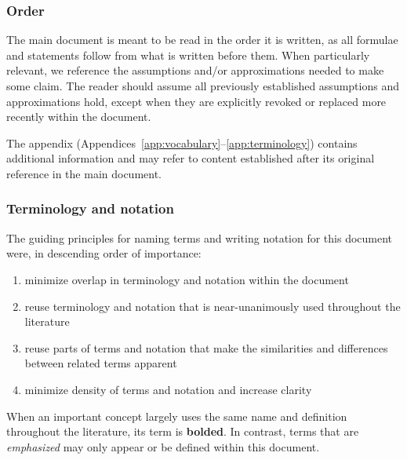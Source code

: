 \documentclass[12pt]{article}
\numberwithin{equation}{section}
\begin{document}
\subsubsection{Order}
The main document is meant to be read in the order it is written, as all formulae and statements follow from what is written before them.
When particularly relevant, we reference the assumptions and/or approximations needed to make some claim.
The reader should assume all previously established assumptions and approximations hold, except when they are explicitly revoked or replaced more recently within the document. 

The appendix (Appendices~\ref{app:vocabulary}--\ref{app:terminology}) contains additional information and may refer to content established after its original reference in the main document.

\subsubsection{Terminology and notation}

The guiding principles for naming terms and writing notation for this document were, in descending order of importance:
\begin{enumerate}[nosep]
\item minimize overlap in terminology and notation within the document
\item reuse terminology and notation that is near-unanimously used throughout the literature
\item reuse parts of terms and notation that make the similarities and differences between related terms apparent
\item minimize density of terms and notation and increase clarity
\end{enumerate}

When an important concept largely uses the same name and definition throughout the literature, its term is \textbf{bolded}.
In contrast, terms that are \emph{emphasized} may only appear or be defined within this document.
\end{document}
